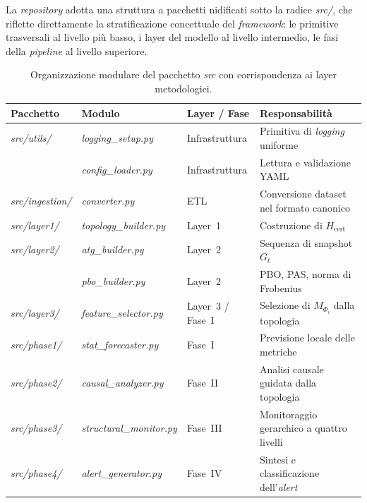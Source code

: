 La \textit{repository} adotta una struttura a pacchetti nidificati sotto la radice \textit{src/},
che riflette direttamente la stratificazione concettuale del \textit{framework}: le primitive
trasversali al livello più basso, i layer del modello al livello intermedio, le fasi della
\textit{pipeline} al livello superiore.

\begin{table}[htbp]
\centering
\caption{Organizzazione modulare del pacchetto \textit{src} con corrispondenza ai layer
metodologici.}
\label{tab:repo_structure}
\begin{tabular}{llll}
\toprule
\textbf{Pacchetto} & \textbf{Modulo} & \textbf{Layer / Fase} & \textbf{Responsabilità} \\
\midrule
\textit{src/utils/}   & \textit{logging\_setup.py}      & Infrastruttura & Primitiva di \textit{logging} uniforme \\
                      & \textit{config\_loader.py}      & Infrastruttura & Lettura e validazione YAML \\
\textit{src/ingestion/}     & \textit{converter.py}           & ETL            & Conversione dataset nel formato canonico \\
\textit{src/layer1/}  & \textit{topology\_builder.py}   & Layer~1        & Costruzione di $H_{\text{cert}}$ \\
\textit{src/layer2/}  & \textit{atg\_builder.py}        & Layer~2        & Sequenza di snapshot $G_t$ \\
                      & \textit{pbo\_builder.py}        & Layer~2        & PBO, PAS, norma di Frobenius \\
\textit{src/layer3/}  & \textit{feature\_selector.py}   & Layer~3 / Fase~I & Selezione di $M_{\Phi_i}$ dalla topologia \\
\textit{src/phase1/}  & \textit{stat\_forecaster.py}    & Fase~I           & Previsione locale delle metriche \\
\textit{src/phase2/}  & \textit{causal\_analyzer.py}    & Fase~II        & Analisi causale guidata dalla topologia \\
\textit{src/phase3/}  & \textit{structural\_monitor.py} & Fase~III       & Monitoraggio gerarchico a quattro livelli \\
\textit{src/phase4/}  & \textit{alert\_generator.py}    & Fase~IV        & Sintesi e classificazione dell'\textit{alert} \\
\bottomrule
\end{tabular}
\end{table}

